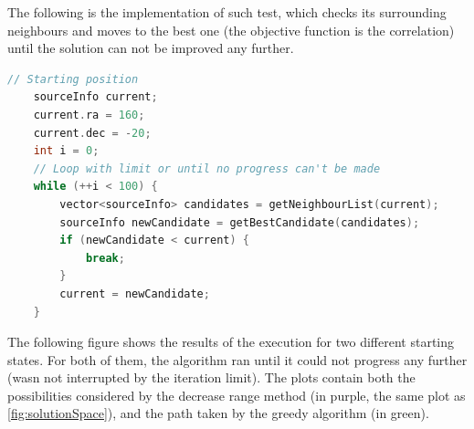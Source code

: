 The following is the implementation of such test, which checks its surrounding neighbours and moves to the best one (the objective function is the correlation) until the solution can not be improved any further.

\begin{minipage}{\linewidth}
	\begin{lstlisting}[language=c, caption=Hill Climbing]
	// Starting position
	sourceInfo current;
	current.ra = 160;
	current.dec = -20;
	int i = 0;
	// Loop with limit or until no progress can't be made
	while (++i < 100) {
		vector<sourceInfo> candidates = getNeighbourList(current);
		sourceInfo newCandidate = getBestCandidate(candidates);
		if (newCandidate < current) {
			break;
		}
		current = newCandidate;
	}
	\end{lstlisting}
\end{minipage}

The following figure shows the results of the execution for two different starting states. For both of them, the algorithm ran until it could not progress any further (wasn not interrupted by the iteration limit). The plots contain both the possibilities considered by the decrease range method (in purple, the same plot as \ref{fig:solutionSpace}), and the path taken by the greedy algorithm (in green).

